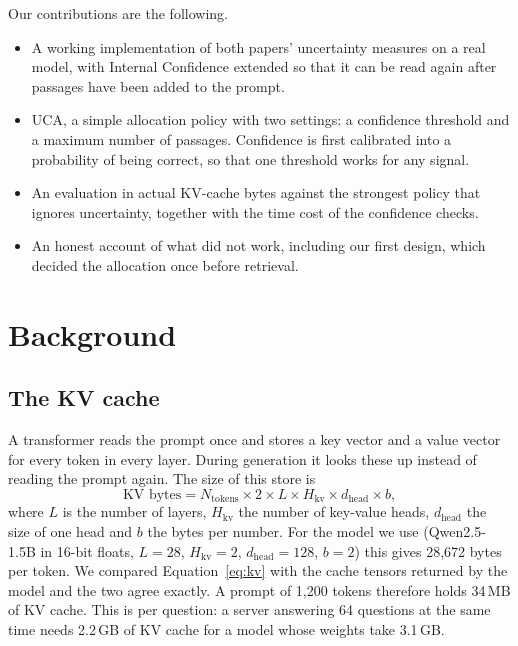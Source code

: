 \documentclass[11pt,a4paper]{article}
\begin{document}
Our contributions are the following.
\begin{itemize}
\item A working implementation of both papers' uncertainty measures on a real
model, with Internal Confidence extended so that it can be read again after
passages have been added to the prompt.
\item UCA, a simple allocation policy with two settings: a confidence threshold
and a maximum number of passages. Confidence is first calibrated into a
probability of being correct, so that one threshold works for any signal.
\item An evaluation in actual KV-cache bytes against the strongest policy that
ignores uncertainty, together with the time cost of the confidence checks.
\item An honest account of what did not work, including our first design, which
decided the allocation once before retrieval.
\end{itemize}

\section{Background}

\subsection{The KV cache}

A transformer reads the prompt once and stores a key vector and a value vector
for every token in every layer. During generation it looks these up instead of
reading the prompt again. The size of this store is
\begin{equation}
\text{KV bytes} = N_{\text{tokens}} \times 2 \times L \times H_{\text{kv}} \times d_{\text{head}} \times b ,
\label{eq:kv}
\end{equation}
where $L$ is the number of layers, $H_{\text{kv}}$ the number of key-value
heads, $d_{\text{head}}$ the size of one head and $b$ the bytes per number. For
the model we use (Qwen2.5-1.5B in 16-bit floats, $L=28$, $H_{\text{kv}}=2$,
$d_{\text{head}}=128$, $b=2$) this gives 28{,}672 bytes per token. We compared
Equation~\ref{eq:kv} with the cache tensors returned by the model and the two
agree exactly. A prompt of 1{,}200 tokens therefore holds 34\,MB of KV cache.
This is per question: a server answering 64 questions at the same time needs
2.2\,GB of KV cache for a model whose weights take 3.1\,GB.
\end{document}
